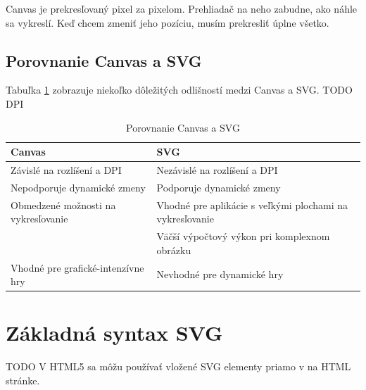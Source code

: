  
 Canvas je prekresľovaný pixel za pixelom. Prehliadač na neho zabudne, ako náhle sa vykreslí. Keď chcem zmeniť jeho pozíciu, musím prekresliť úplne všetko. 
 
 
 
 
 \subsection{Porovnanie Canvas a SVG}
 Tabuľka \ref{canvas:SVG} zobrazuje niekoľko dôležitých odlišností medzi Canvas a SVG. 
 TODO DPI
 \begin{table}[hp]
 \centering
 \begin{tabular}{|l|p{7.5cm} |}
 	\hline \textbf{Canvas} & \textbf{SVG} \\
 	 	\hline Závislé na rozlíšení a \acs{DPI} & Nezávislé na rozlíšení a DPI \\ 
 	\hline Nepodporuje dynamické zmeny & Podporuje dynamické zmeny \\ 
 	\hline Obmedzené možnosti na vykresľovanie  & Vhodné pre aplikácie s veľkými plochami na vykresľovanie \\ 
 	\hline & Väčší výpočtový výkon pri komplexnom obrázku \\ 
 	\hline Vhodné pre grafické-intenzívne hry & Nevhodné pre dynamické hry \\ 
 	\hline 
 \end{tabular} 

 \caption{Porovnanie Canvas a SVG}
 \label{canvas:SVG}
 
\end{table}
 
 
 \section{Základná syntax \acs*{SVG}}
TODO
V HTML5 sa môžu používať vložené SVG elementy priamo v na HTML stránke. 

